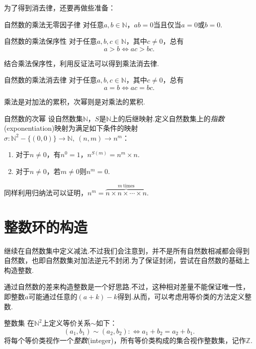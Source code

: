 为了得到消去律，还要再做些准备：

\begin{proposition}{自然数的乘法无零因子律}
	对任意$a,b \in \mathbb{N}$，$ab=0$当且仅当$a=0$或$b=0$.
\end{proposition}

\begin{proposition}{自然数的乘法保序性}
	对于任意$a,b,c \in \mathbb{N}$，其中$c \neq 0$，总有$$a>b \Leftrightarrow ac>bc.$$
\end{proposition}

结合乘法保序性，利用反证法可以得到乘法消去律.

\begin{corollary}{自然数的乘法消去律}
	对于任意$a,b,c \in \mathbb{N}$，其中$c \neq 0$，总有$$a=b \Leftrightarrow ac=bc.$$
\end{corollary}

乘法是对加法的累积，次幂则是对乘法的累积.

\begin{definition}{自然数的次幂}
	设自然数集$\mathbb{N}$，$S$是$\mathbb{N}$上的后继映射.定义自然数集上的\textit{指数}(exponentiation)映射为满足如下条件的映射$\sigma :\mathbb{N}^2-\{ (0,0) \} \to \mathbb{N},~(n,m) \to n^m$：
	\begin{enumerate}
		\item 对于$n \neq 0$，有$n^0=1$，$n^{S(m)}=n^m \times n$.
		\item 对于$n \neq 0$，若$m \neq 0$则$n^m=0$.
	\end{enumerate}
\end{definition}

同样利用归纳法可以证明，$n^m = \overbrace{n\times n\times \cdots \times n}^{m~ \text{times}}$.



\section{整数环的构造}

继续在自然数集中定义减法.不过我们会注意到，并不是所有自然数相减都会得到自然数，也即自然数集对加法逆元不封闭.为了保证封闭，尝试在自然数的基础上构造整数.

通过自然数的差来构造整数是一个好思路.不过，这种相对差量不能保证唯一性，即整数$a$可能通过任意的$(a+k)-k$得到.从而，可以考虑用等价类的方法定义整数.

\begin{definition}{整数集}
	在$\mathbb{N}^2$上定义等价关系$\sim$如下：$$(a_1,b_1) \sim (a_2,b_2) :\Leftrightarrow a_1+b_2=a_2+b_1.$$
	将每个等价类视作一个\textit{整数}(integer)，所有等价类构成的集合视作整数集，记作$\mathbb{Z}$.
\end{definition}

